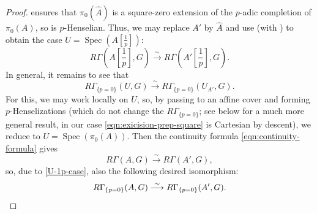 \documentclass[11pt, reqno]{amsart}
\newcommand{\bZ}{\mathbb{Z}}
\newcommand{\cH}{\mathcal{H}}
\DeclareMathOperator{\Spec}{Spec}		%
\newcommand{\et}{\mathrm{\acute{e}t}}	%
\newcommand{\isomto}{\overset{\sim}{\longrightarrow}}
\newcommand{\wh}{\widehat}
\providecommand{\f}[2]{\frac{#1}{#2}}
\newcommand{\lab}{\label}
\newcommand{\x}{\text}
\newcommand{\q}{\quad}
\newcommand{\tst}{\textstyle}
\newcommand{\be}{\begin{equation}}
\newcommand{\ee}{\end{equation}}
\newcommand{\bpf}{\begin{proof}}
\newcommand{\epf}{\end{proof}}
\numberwithin{equation}{numberingbase}
\theoremstyle{thms}
\theoremstyle{claims}
\theoremstyle{defs}
\theoremstyle{thms}
\theoremstyle{defs}
\theoremstyle{subsection-tweak}
\theoremstyle{subsection-tweak}
\begin{document}
\bpf
{} ensures that $\pi_0(\wh{A})$ is a square-zero extension of the $p$-adic completion of $\pi_0(A)$, so is $p$-Henselian. Thus, we may replace $A'$ by $\wh{A}$ and use  (with ) to obtain the case $U = \Spec(A[\f{1}{p}])$:
\be \lab{U-1p-case}
\tst R\Gamma(A[\f 1p], G) \isomto R\Gamma(A'[\f 1p], G).
\ee
In general, it remains to see that 
\[
R\Gamma_{\{p = 0\}}(U, G) \isomto R\Gamma_{\{p = 0\}}(U_{A'}, G).
\]
 For this, we may work locally on $U$, so, by passing to an affine cover and forming $p$-Henselizations (which do not change the $R\Gamma_{\{ p = 0\}}$; see  below for a much more general result, in our case \eqref{eqn:exicision-prep-square} is Cartesian by descent), we reduce to $U = \Spec(\pi_0(A))$. Then  the continuity formula \eqref{eqn:continuity-formula} gives 
 \[
 R\Gamma(A, G) \isomto R\Gamma(A', G),
 \]
 so, due to \eqref{U-1p-case}, also the following desired isomorphism:
 \[
 R\Gamma_{\{p = 0\}}(A, G) \isomto R\Gamma_{\{p = 0\}}(A', G). \qedhere
 \]
\epf 	
\end{document}
